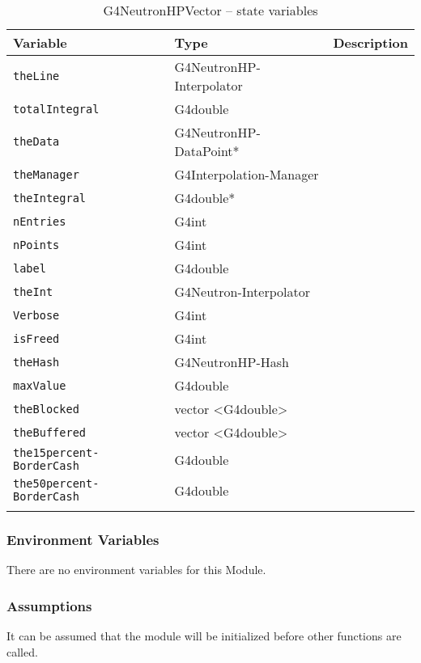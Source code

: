 \documentclass[12pt]{article}
\begin{document}
\begin{table}[h]
\caption{G4NeutronHPVector -- state variables}\label{Table_NeutronHPDataPointStateVariables}
\begin{tabularx}{\textwidth}{p{}p{}p{}}
\toprule
\bf Variable & \bf Type & \bf Description\\\midrule
\arrayrulecolor{lightgray}
\texttt{theLine} & G4NeutronHP-Interpolator & \\\hline
\texttt{totalIntegral} & G4double & \\\hline
\texttt{theData} & G4NeutronHP-DataPoint* & \\\hline
\texttt{theManager} & G4Interpolation-Manager & \\\hline
\texttt{theIntegral} & G4double* & \\\hline
\texttt{nEntries} & G4int & \\\hline
\texttt{nPoints} & G4int & \\\hline
\texttt{label} & G4double & \\\hline
\texttt{theInt} & G4Neutron-Interpolator & \\\hline
\texttt{Verbose} & G4int & \\\hline
\texttt{isFreed} & G4int & \\\hline
\texttt{theHash} & G4NeutronHP-Hash & \\\hline
\texttt{maxValue} & G4double & \\\hline
\texttt{theBlocked} & vector \textless G4double\textgreater & \\\hline
\texttt{theBuffered} & vector \textless G4double\textgreater & \\\hline
\texttt{the15percent- BorderCash} & G4double & \\\hline
\texttt{the50percent- BorderCash} & G4double & \\\hline
\arrayrulecolor{black}
\end{tabularx}
\end{table}

\subsubsection{Environment Variables}%
There are no environment variables for this Module.

\subsubsection{Assumptions}%
It can be assumed that the module will be initialized before other functions are called.
\end{document}
